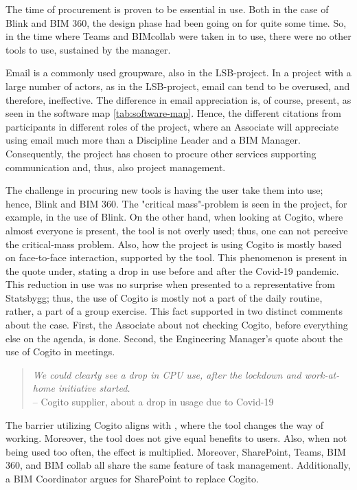 The time of procurement is proven to be essential in use. Both in the case of Blink and BIM 360, the design phase had been going on for quite some time. So, in the time where Teams and BIMcollab were taken in to use, there were no other tools to use, sustained by the manager.

Email is a commonly used groupware, also in the LSB-project. In a project with a large number of actors, as in the LSB-project, email can tend to be overused, and therefore, ineffective. The difference in email appreciation is, of course, present, as seen in the software map \ref{tab:software-map}. Hence, the different citations from participants in different roles of the project, where an Associate will appreciate using email much more than a Discipline Leader and a BIM Manager. Consequently, the project has chosen to procure other services supporting communication and, thus, also project management.

The challenge in procuring new tools is having the user take them into use; hence, Blink and BIM 360. The "critical mass"-problem \citep{markus1987toward} is seen in the project, for example, in the use of Blink. On the other hand, when looking at Cogito, where almost everyone is present, the tool is not overly used; thus, one can not perceive the critical-mass problem. Also, how the project is using Cogito is mostly based on face-to-face interaction, supported by the tool. This phenomenon is present in the quote under, stating a drop in use before and after the Covid-19 pandemic. This reduction in use was no surprise when presented to a representative from Statsbygg; thus, the use of Cogito is mostly not a part of the daily routine, rather, a part of a group exercise. This fact supported in two distinct comments about the case. First, the Associate about not checking Cogito, before everything else on the agenda, is done. Second, the Engineering Manager's quote about the use of Cogito in meetings. 

\begin{quote}
    \textit{We could clearly see a drop in CPU use, after the lockdown and work-at-home initiative started.} \\
    – Cogito supplier, about a drop in usage due to Covid-19
\end{quote}

The barrier utilizing Cogito aligns with \citet{grudin1989groupware}, where the tool changes the way of working. Moreover, the tool does not give equal benefits to users. Also, when not being used too often, the effect is multiplied. Moreover, SharePoint, Teams, BIM 360, and BIM collab all share the same feature of task management. Additionally, a BIM Coordinator argues for SharePoint to replace Cogito.


